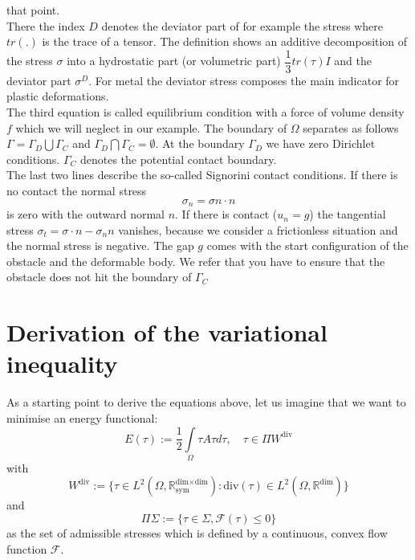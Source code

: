 \documentclass{article}
\begin{document}
that point.\\
There the index $D$ denotes the deviator part of for example the stress where
$tr(.)$ is the trace of a tensor. The definition shows an additive decomposition
of the stress $\sigma$ into a hydrostatic part (or volumetric part) $\dfrac{1}{3}tr(\tau)I$ and the deviator
part $\sigma^D$. For metal the deviator stress composes the main indicator for
plastic deformations.\\
The third equation is called equilibrium condition with a force of volume
density $f$ which we will neglect in our example.
The boundary of $\Omega$ separates as follows $\Gamma=\Gamma_D\bigcup\Gamma_C$ and $\Gamma_D\bigcap\Gamma_C=\emptyset$.
At the boundary $\Gamma_D$ we have zero Dirichlet conditions. $\Gamma_C$ denotes the potential contact boundary.\\
The last two lines describe the so-called Signorini contact conditions. If there is no contact the normal  stress
$$ \sigma_n =  \sigma n\cdot n$$
is zero with the outward normal $n$. If there is contact ($u_n = g$) the tangential stress $\sigma_t = \sigma\cdot n - \sigma_n n$
vanishes, because we consider a frictionless situation and the normal stress is
negative. The gap $g$ comes with the start configuration of the obstacle and the
deformable body. We refer that you have to ensure that the obstacle does not hit
the boundary of $\Gamma_C$

\section{Derivation of the variational inequality}

As a starting point to derive the equations above, let us imagine that we want
to minimise an energy functional:
$$E(\tau) := \dfrac{1}{2}\int\limits_{\Omega}\tau A \tau d\tau,\quad \tau\in \Pi W^{\textrm{div}}$$
with
$$W^{\textrm{div}}:=\lbrace \tau\in
L^2(\Omega,\mathbb{R}^{\textrm{dim}\times\textrm{dim}}_{\textrm{sym}}):\textrm{div}(\tau)\in L^2(\Omega,\mathbb{R}^{\textrm{dim}})\rbrace$$ and
$$\Pi \Sigma:=\lbrace \tau\in \Sigma, \mathcal{F}(\tau)\leq 0\rbrace$$
as the set of admissible stresses which is defined
by a continuous, convex flow function $\mathcal{F}$.
\end{document}
